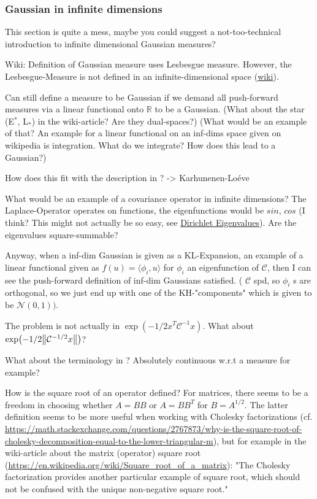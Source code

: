 \documentclass[11pt]{article}
\newcommand{\C}{{\mathcal{C}}}
\newcommand{\R}{{\mathbb{R}}}
\newcommand{\N}[2]{\mathcal{N}\left(#1,#2\right)}
\begin{document}
\subsubsection{Gaussian in infinite dimensions}
\label{sec:org1f4434d}
This section is quite a mess, maybe you could suggest a not-too-technical introduction
to infinite dimensional Gaussian measures?

Wiki: Definition of Gaussian measure uses Lesbesgue measure.
However, the Lesbesgue-Measure is not defined in an infinite-dimensional space (\href{https://en.wikipedia.org/wiki/Infinite-dimensional\_Lebesgue\_measure}{wiki}).

Can still define a measure to be Gaussian if we demand all push-forward measures via a
linear functional onto \(\R\) to be a Gaussian. (What about the star (E\(^{\text{*}}\), L\(_{\text{*}}\))
in the wiki-article? Are they dual-spaces?) (What would be an example of that? An example
for a linear functional on an inf-dims space given on wikipedia is integration.
What do we integrate? How does this lead to a Gaussian?)

How does this fit with the description in \cite{cotter_mcmc_2013}? -> Karhunenen-Loéve

What would be an example of a covariance operator in infinite dimensions?
The Laplace-Operator operates on functions, the eigenfunctions would be \(sin\), \(cos\) (I think?
This might not actually be so easy, see \href{https://en.wikipedia.org/wiki/Dirichlet\_eigenvalue}{Dirichlet Eigenvalues}). Are the eigenvalues
square-summable?

Anyway, when a inf-dim Gaussian is given as a KL-Expansion, an  example of a linear functional
given as \(f(u) = \langle \phi_i, u \rangle\) for \(\phi_i\) an eigenfunction of \(\C\), then I can see
the push-forward definition of inf-dim Gaussians satisfied. ( \(\C\) spd, so \(\phi_i\) s are
orthogonal, so we just end up with one of the KH-"components" which is given to be \(\N{0}{1})\).

The problem is not actually in \(\exp(-1/2x^T\C^{-1}x)\). What about \(\exp(-1/2\norm{\C^{-1/2}x})\)?

What about the terminology in \cite{cotter_mcmc_2013}? Absolutely continuous w.r.t a measure for
example?

How is the square root of an operator defined? For matrices, there seems to be a freedom in
choosing whether \(A = BB\) or \(A = BB^T\) for \(B = A^{1/2}\). The latter definition seems to
be more useful when working with Cholesky factorizations (cf. \url{https://math.stackexchange.com/questions/2767873/why-is-the-square-root-of-cholesky-decomposition-equal-to-the-lower-triangular-m}),
but for example in the wiki-article about the matrix (operator) square root (\url{https://en.wikipedia.org/wiki/Square\_root\_of\_a\_matrix}):
"The Cholesky factorization provides another particular example of square root, which should not be confused with the unique non-negative square root."
\end{document}
